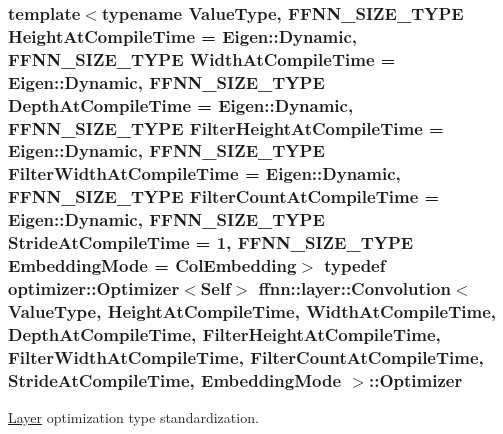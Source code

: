 \hypertarget{classffnn_1_1layer_1_1_convolution_abc5463dd8445a40bdc93716493a87a21}{
\subsubsection[{Optimizer}]{\setlength{\rightskip}{0pt plus 5cm}template$<$typename Value\-Type, F\-F\-N\-N\-\_\-\-S\-I\-Z\-E\-\_\-\-T\-Y\-P\-E Height\-At\-Compile\-Time = Eigen\-::\-Dynamic, F\-F\-N\-N\-\_\-\-S\-I\-Z\-E\-\_\-\-T\-Y\-P\-E Width\-At\-Compile\-Time = Eigen\-::\-Dynamic, F\-F\-N\-N\-\_\-\-S\-I\-Z\-E\-\_\-\-T\-Y\-P\-E Depth\-At\-Compile\-Time = Eigen\-::\-Dynamic, F\-F\-N\-N\-\_\-\-S\-I\-Z\-E\-\_\-\-T\-Y\-P\-E Filter\-Height\-At\-Compile\-Time = Eigen\-::\-Dynamic, F\-F\-N\-N\-\_\-\-S\-I\-Z\-E\-\_\-\-T\-Y\-P\-E Filter\-Width\-At\-Compile\-Time = Eigen\-::\-Dynamic, F\-F\-N\-N\-\_\-\-S\-I\-Z\-E\-\_\-\-T\-Y\-P\-E Filter\-Count\-At\-Compile\-Time = Eigen\-::\-Dynamic, F\-F\-N\-N\-\_\-\-S\-I\-Z\-E\-\_\-\-T\-Y\-P\-E Stride\-At\-Compile\-Time = 1, F\-F\-N\-N\-\_\-\-S\-I\-Z\-E\-\_\-\-T\-Y\-P\-E Embedding\-Mode = Col\-Embedding$>$ typedef {\bf optimizer\-::\-Optimizer}$<${\bf Self}$>$ {\bf ffnn\-::layer\-::\-Convolution}$<$ Value\-Type, Height\-At\-Compile\-Time, Width\-At\-Compile\-Time, Depth\-At\-Compile\-Time, Filter\-Height\-At\-Compile\-Time, Filter\-Width\-At\-Compile\-Time, Filter\-Count\-At\-Compile\-Time, Stride\-At\-Compile\-Time, {\bf Embedding\-Mode} $>$\-::{\bf Optimizer}}}\label{classffnn_1_1layer_1_1_convolution_abc5463dd8445a40bdc93716493a87a21}


\hyperlink{classffnn_1_1layer_1_1_layer}{Layer} optimization type standardization. 

